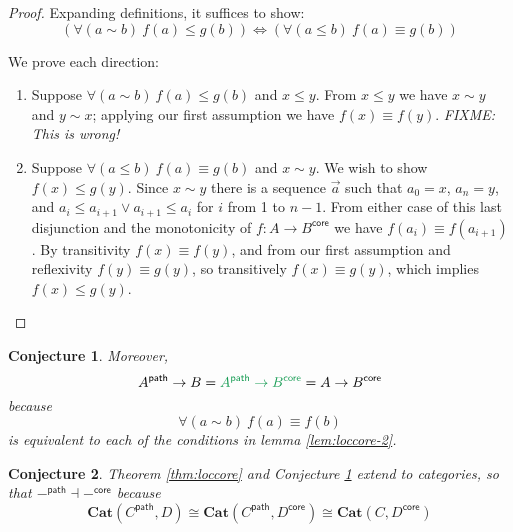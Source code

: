 \documentclass{article}
\newtheorem{conjecture}{Conjecture}
\newcommand{\ms}[1]{\ensuremath{\mathsf{#1}}}
\newcommand{\mb}[1]{\ensuremath{\mathbf{#1}}}
\newcommand{\iso}{\ms{core}}
\renewcommand{\path}{\ms{path}}
\newcommand{\pathto}{\sim}
\begin{document}
\begin{proof}
  Expanding definitions, it suffices to show:
  \[ (\forall(a \pathto b)\ f(a) \le g(b))
  \iff
  (\forall(a \le b)\ f(a) \equiv g(b))
  \]

  We prove each direction:
  \begin{enumerate}
  \item Suppose $\forall(a \pathto b)\ f(a) \le g(b)$ and $x \le y$. From $x \le
    y$ we have $x \pathto y$ and $y \pathto x$; {\color{red} applying our first
      assumption we have $f(x) \equiv f(y)$. \emph{FIXME: This is wrong!}}

  \item Suppose $\forall(a \le b)\ f(a) \equiv g(b)$ and $x \pathto y$. We wish
    to show $f(x) \le g(y)$. Since $x \pathto y$ there is a sequence $\vec{a}$
    such that $a_0 = x$, $a_n = y$, and $a_i \le a_{i+1} \vee a_{i+1} \le a_i$
    for $i$ from 1 to $n-1$. From either case of this last disjunction and the
    monotonicity of $f : A \to B^\iso$ we have $f(a_i) \equiv f(a_{i+1})$. By
    transitivity $f(x) \equiv f(y)$, and from our first assumption and
    reflexivity $f(y) \equiv g(y)$, so transitively $f(x) \equiv g(y)$, which
    implies $f(x) \le g(y)$.
  \end{enumerate}
\end{proof}

\begin{conjecture} \label{cnj:loccore} Moreover,
  \[ A^\path \to B = {\color{ForestGreen} A^\path \to B^\iso} = A \to B^\iso \]
  because
  \[ \forall(a \pathto b)\ f(a) \equiv f(b) \]
  is equivalent to each of the conditions in lemma \ref{lem:loccore-2}.
\end{conjecture}


\begin{conjecture}
  Theorem \ref{thm:loccore} and Conjecture \ref{cnj:loccore} extend to
  categories, so that $-^\path \dashv -^\iso$ because
  \begin{equation}
    \mb{Cat}(C^\path, D) \cong \mb{Cat}(C^\path, D^\iso) \cong \mb{Cat}(C, D^\iso)
  \end{equation}
\end{conjecture}
\end{document}
